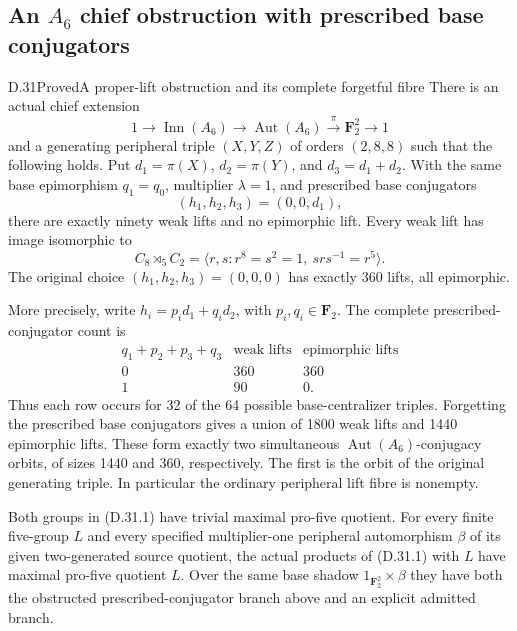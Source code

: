\subsection{An \texorpdfstring{$A_6$}{A6} chief obstruction with prescribed base conjugators}

\begin{statement}{D.31}{Proved}{A proper-lift obstruction and its complete forgetful fibre}
There is an actual chief extension
\[
 1\longrightarrow\operatorname{Inn}(A_6)
 \longrightarrow\operatorname{Aut}(A_6)
 \xrightarrow{\pi}\mathbf F_2^2\longrightarrow1
 \tag{D.31.1}
\]
and a generating peripheral triple $(X,Y,Z)$ of
orders $(2,8,8)$ such that the following holds.
Put $d_1=\pi(X)$, $d_2=\pi(Y)$, and
$d_3=d_1+d_2$.  With the same base epimorphism
$q_1=q_0$, multiplier $\lambda=1$, and prescribed
base conjugators
\[
                    (h_1,h_2,h_3)=(0,0,d_1),
 \tag{D.31.2}
\]
there are exactly ninety weak lifts and no
epimorphic lift.  Every weak lift has image
isomorphic to
\[
       C_8\rtimes_5 C_2
       =\langle r,s:r^8=s^2=1,\ srs^{-1}=r^5\rangle.
 \tag{D.31.3}
\]
The original choice $(h_1,h_2,h_3)=(0,0,0)$
has exactly 360 lifts, all epimorphic.

More precisely, write
$h_i=p_i d_1+q_i d_2$, with $p_i,q_i\in\mathbf F_2$.
The complete prescribed-conjugator count is
\[
 \begin{array}{c|cc}
 q_1+p_2+p_3+q_3&\text{weak lifts}&\text{epimorphic lifts}\\\hline
 0&360&360\\
 1&90&0.
 \end{array}
 \tag{D.31.4}
\]
Thus each row occurs for 32 of the 64 possible
base-centralizer triples.  Forgetting the
prescribed base conjugators gives a union of
1800 weak lifts and 1440 epimorphic lifts.
These form exactly two simultaneous
$\operatorname{Aut}(A_6)$-conjugacy orbits, of
sizes 1440 and 360, respectively.  The first is
the orbit of the original generating triple.
In particular the ordinary peripheral lift
fibre is nonempty.

Both groups in \textup{(D.31.1)} have trivial
maximal pro-five quotient.  For every finite
five-group $L$ and every specified
multiplier-one peripheral automorphism $\beta$
of its given two-generated source quotient,
the actual products of \textup{(D.31.1)}
with $L$ have maximal pro-five quotient $L$.
Over the same base shadow
$1_{\mathbf F_2^2}\times\beta$ they have both
the obstructed prescribed-conjugator branch
above and an explicit admitted branch.
\end{statement}

